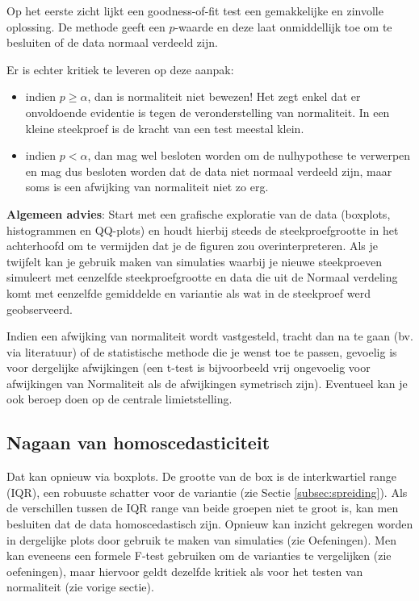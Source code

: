 \documentclass[
  12pt,dutch,coursenotes]{book}
\providecommand{\tightlist}{%
  \setlength{\itemsep}{0pt}\setlength{\parskip}{0pt}}
\theoremstyle{definition}
\theoremstyle{definition}
\theoremstyle{definition}
\theoremstyle{remark}
\begin{document}
Op het eerste zicht lijkt een goodness-of-fit test een gemakkelijke en zinvolle oplossing. De methode geeft een \(p\)-waarde en deze laat onmiddellijk toe om te besluiten of de data normaal verdeeld zijn.

Er is echter kritiek te leveren op deze aanpak:

\begin{itemize}
\tightlist
\item
  indien \(p\geq \alpha\), dan is normaliteit niet bewezen! Het zegt enkel dat er onvoldoende evidentie is tegen de veronderstelling van normaliteit. In een kleine steekproef is de kracht van een test meestal klein.
\item
  indien \(p<\alpha\), dan mag wel besloten worden om de nulhypothese te verwerpen en mag dus besloten worden dat de data niet normaal verdeeld zijn, maar soms is een afwijking van normaliteit niet zo erg.
\end{itemize}

\textbf{Algemeen advies}:
Start met een grafische exploratie van de data (boxplots, histogrammen en QQ-plots) en houdt hierbij steeds de steekproefgrootte in het achterhoofd om te vermijden dat je de figuren zou overinterpreteren. Als je twijfelt kan je gebruik maken van simulaties waarbij je nieuwe steekproeven simuleert met eenzelfde steekproefgrootte en data die uit de Normaal verdeling komt met eenzelfde gemiddelde en variantie als wat in de steekproef werd geobserveerd.

Indien een afwijking van normaliteit wordt vastgesteld, tracht dan na te gaan (bv. via literatuur) of de statistische methode die je wenst toe te passen, gevoelig is voor dergelijke afwijkingen (een t-test is bijvoorbeeld vrij ongevoelig voor afwijkingen van Normaliteit als de afwijkingen symetrisch zijn). Eventueel kan je ook beroep doen op de centrale limietstelling.

\hypertarget{nagaan-van-homoscedasticiteit}{%
\subsection{Nagaan van homoscedasticiteit}\label{nagaan-van-homoscedasticiteit}}

Dat kan opnieuw via boxplots.
De grootte van de box is de interkwartiel range (IQR), een robuuste schatter voor de variantie (zie Sectie \ref{subsec:spreiding}).
Als de verschillen tussen de IQR range van beide groepen niet te groot is, kan men besluiten dat de data homoscedastisch zijn.
Opnieuw kan inzicht gekregen worden in dergelijke plots door gebruik te maken van simulaties (zie Oefeningen).
Men kan eveneens een formele F-test gebruiken om de varianties te vergelijken (zie oefeningen), maar hiervoor geldt dezelfde kritiek als voor het testen van normaliteit (zie vorige sectie).
\end{document}
